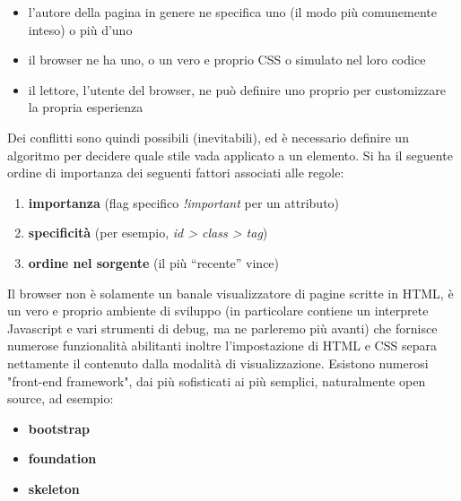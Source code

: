 \documentclass[a4paper,12pt, oneside]{book}
\begin{document}
\begin{itemize}
	\item l'autore della pagina in genere ne specifica uno (il modo più comunemente inteso) o più d'uno
	\item il browser ne ha uno, o un vero e proprio CSS o simulato nel loro codice
	\item il lettore, l’utente del browser, ne può definire uno proprio per customizzare la propria esperienza
\end{itemize}
Dei conflitti sono quindi possibili (inevitabili), ed è necessario definire un algoritmo per decidere quale stile vada applicato a un elemento. Si ha il seguente ordine di importanza dei seguenti fattori associati alle regole:
\begin{enumerate}
	\item \textbf{importanza} (flag specifico \textit{!important} per un attributo)
	\item \textbf{specificità} (per esempio, \textit{id > class > tag})
	\item \textbf{ordine nel sorgente }(il più “recente” vince)
\end{enumerate}
Il browser non è solamente un banale visualizzatore di pagine
scritte in HTML, è un vero e proprio ambiente di sviluppo (in
particolare contiene un interprete Javascript e vari strumenti di debug, ma ne parleremo più avanti) che fornisce numerose funzionalità abilitanti inoltre l'impostazione di HTML e CSS separa nettamente il contenuto
dalla modalità di visualizzazione. Esistono numerosi "front-end framework", dai più sofisticati ai
più semplici, naturalmente open
source, ad esempio:
\begin{itemize}
	\item \textbf{bootstrap}
	\item \textbf{foundation}
	\item \textbf{skeleton}
\end{itemize}
\end{document}
